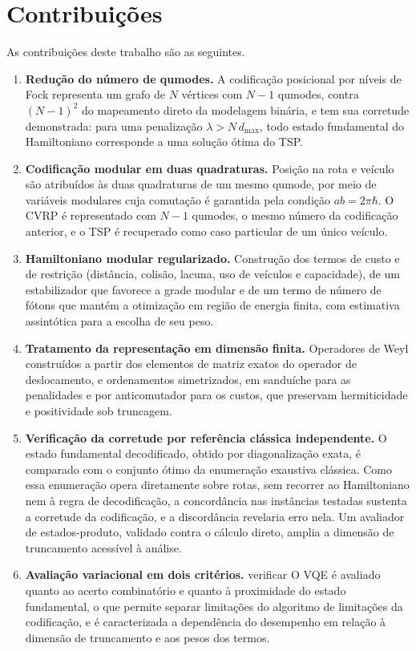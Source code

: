 \section*{Contribuições}

As contribuições deste trabalho são as seguintes.
\begin{enumerate}
    \item \textbf{Redução do número de qumodes.} A codificação posicional por níveis de Fock representa um grafo de $N$ vértices com $N-1$ qumodes, contra $(N-1)^2$ do mapeamento direto da modelagem binária, e tem sua corretude demonstrada: para uma penalização $\lambda > N\,d_{\max}$, todo estado fundamental do Hamiltoniano corresponde a uma solução ótima do TSP.

    \item \textbf{Codificação modular em duas quadraturas.} Posição na rota e veículo são atribuídos às duas quadraturas de um mesmo qumode, por meio de variáveis modulares cuja comutação é garantida pela condição $ab = 2\pi\hbar$. O CVRP é representado com $N-1$ qumodes, o mesmo número da codificação anterior, e o TSP é recuperado como caso particular de um único veículo.

    \item \textbf{Hamiltoniano modular regularizado.} Construção dos termos de custo e de restrição (distância, colisão, lacuna, uso de veículos e capacidade), de um estabilizador que favorece a grade modular e de um termo de número de fótons que mantém a otimização em região de energia finita, com estimativa assintótica para a escolha de seu peso.

    \item \textbf{Tratamento da representação em dimensão finita.} Operadores de Weyl construídos a partir dos elementos de matriz exatos do operador de deslocamento, e ordenamentos simetrizados, em sanduíche para as penalidades e por anticomutador para os custos, que preservam hermiticidade e positividade sob truncagem.

    \item \textbf{Verificação da corretude por referência clássica independente.} O estado fundamental decodificado, obtido por diagonalização exata, é comparado com o conjunto ótimo da enumeração exaustiva clássica. Como essa enumeração opera diretamente sobre rotas, sem recorrer ao Hamiltoniano nem à regra de decodificação, a concordância nas instâncias testadas sustenta a corretude da codificação, e a discordância revelaria erro nela. Um avaliador de estados-produto, validado contra o cálculo direto, amplia a dimensão de truncamento acessível à análise.

    \item \textbf{Avaliação variacional em dois critérios.} {\color{red} verificar} O VQE é avaliado quanto ao acerto combinatório e quanto à proximidade do estado fundamental, o que permite separar limitações do algoritmo de limitações da codificação, e é caracterizada a dependência do desempenho em relação à dimensão de truncamento e aos pesos dos termos.
\end{enumerate}


